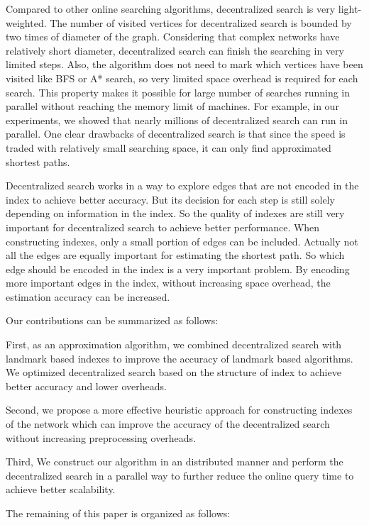 Compared to other online searching algorithms, decentralized search is very light-weighted. The number of visited vertices for decentralized search is bounded by two times of diameter of the graph. Considering that complex networks have relatively short diameter, decentralized search can finish the searching in very limited steps. Also, the algorithm does not need to mark which vertices have been visited like BFS or A* search, so very limited space overhead is required for each search. This property makes it possible for large number of searches running in parallel without reaching the memory limit of machines. For example, in our experiments, we showed that nearly millions of decentralized search can run in parallel. One clear drawbacks of decentralized search is that since the speed is traded with relatively small searching space, it can only find approximated shortest paths.

Decentralized search works in a way to explore edges that are not encoded in the index to achieve better accuracy. But its decision for each step is still solely depending on information in the index. So the quality of indexes are still very important for decentralized search to achieve better performance. When constructing indexes, only a small portion of edges can be included. Actually not all the edges are equally important for estimating the shortest path. So which edge should be encoded in the index is a very important problem. By encoding more important edges in the index, without increasing space overhead, the estimation accuracy can be increased.

Our contributions can be summarized as follows:

First, as an approximation algorithm, we combined decentralized search with landmark based indexes to improve the accuracy of landmark based algorithms. We optimized decentralized search based on the structure of index to achieve better accuracy and lower overheads.

Second, we propose a more effective heuristic approach for constructing indexes of the network which can improve the accuracy of the decentralized search without increasing preprocessing overheads.

Third, We construct our algorithm in an distributed manner and perform the decentralized search in a parallel way to further reduce the online query time to achieve better scalability.

The remaining of this paper is organized as follows:
